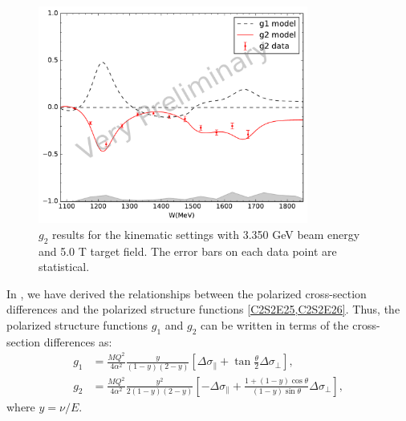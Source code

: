 \begin{figure}[tb!]
  \centering
  \includegraphics[width=0.79\textwidth]{figs/g1g2-model-33505090.pdf}
  \caption[$g_2$ results with $E=3.350$ GeV and $B=5.0$ T.]{$g_2$ results for the kinematic settings with 3.350 GeV beam energy and 5.0 T target field. The error bars on each data point are statistical. \label{C8S4F4}}
\end{figure}

In , we have derived the relationships between the polarized cross-section differences and the polarized structure functions \cref{C2S2E25,C2S2E26}. Thus, the polarized structure functions $g_1$ and $g_2$ can be written in terms of the cross-section differences as:
\begin{align} \label{C8S4E1}
g_1 & = \frac{MQ^2}{4\alpha^2}\frac{y}{(1-y)(2-y)}\left[\Delta\sigma_\parallel+\tan\frac{\theta}{2}\Delta\sigma_\perp\right], \\ \label{C8S4E2}
g_2 & = \frac{MQ^2}{4\alpha^2}\frac{y^2}{2(1-y)(2-y)}\left[-\Delta\sigma_\parallel+\frac{1+(1-y)\cos\theta}{(1-y)\sin\theta}\Delta\sigma_\perp\right],
\end{align}
where $y=\nu/E$.

